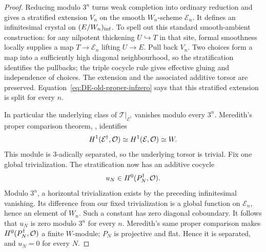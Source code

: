 \begin{proof}
Reducing modulo $3^n$ turns weak completion into ordinary reduction and gives a stratified extension $V_n$ on the smooth $W_n$-scheme $\mathcal E_n$.  It defines an infinitesimal crystal on $(E/W_n)_{\rm inf}$.  To spell out this standard smooth-ambient construction: for any nilpotent thickening $U\hookrightarrow T$ in that site, formal smoothness locally supplies a map $T\to\mathcal E_n$ lifting $U\to E$.  Pull back $V_n$.  Two choices form a map into a sufficiently high diagonal neighbourhood, so the stratification identifies the pullbacks; the triple cocycle rule gives effective gluing and independence of choices.  The extension and the associated additive torsor are preserved.  Equation~\eqref{eq:DE-old-proper-infzero} says that this stratified extension is split for every $n$.

In particular the underlying class of $\mathcal T|_{\mathcal E^\dagger}$ vanishes modulo every $3^n$.  Meredith's proper comparison theorem, \cite[\S5, Theorem~A, p.~25; or its projective Theorem~B]{Meredith1972}, identifies
\[
 H^1(\mathcal E^\dagger,\mathcal O)
                  \simeq H^1(\mathcal E,\mathcal O)\simeq W.
\]
This module is $3$-adically separated, so the underlying torsor is trivial.  Fix one global trivialization.  The stratification now has an additive cocycle
\[
                         u_N\in H^0(P_N^\dagger,\mathcal O).
\]
Modulo $3^n$, a horizontal trivialization exists by the preceding infinitesimal vanishing.  Its difference from our fixed trivialization is a global function on $\mathcal E_n$, hence an element of $W_n$.  Such a constant has zero diagonal coboundary.  It follows that $u_N$ is zero modulo $3^n$ for every $n$.  Meredith's same proper comparison makes $H^0(P_N^\dagger,\mathcal O)$ a finite $W$-module; $P_N$ is projective and flat.  Hence it is separated, and $u_N=0$ for every $N$.


\end{proof}
